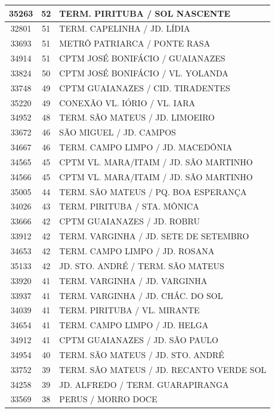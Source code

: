 \documentclass[
	12pt,				%
	oneside,			%
	a4paper,			%
	english,			%
	brazil				%
	]{abntex2ppgsi}
\begin{document}
{{{\begin{apendicesenv}
\begin{longtable}{c|c|p{7cm}}
 \hline 
35263 &	52 &	TERM. PIRITUBA / SOL NASCENTE \\ 
 \hline 
32801 &	51 &	TERM. CAPELINHA / JD. LÍDIA \\ 
 \hline 
33693 &	51 &	METRÔ PATRIARCA / PONTE RASA \\ 
 \hline 
34914 &	51 &	CPTM JOSÉ BONIFÁCIO / GUAIANAZES \\ 
 \hline 
33824 &	50 &	CPTM JOSÉ BONIFÁCIO / VL. YOLANDA \\ 
 \hline 
33748 &	49 &	CPTM GUAIANAZES / CID. TIRADENTES \\ 
 \hline 
35220 &	49 &	CONEXÃO VL. IÓRIO / VL. IARA \\ 
 \hline 
34952 &	48 &	TERM. SÃO MATEUS / JD. LIMOEIRO \\ 
 \hline 
33672 &	46 &	SÃO MIGUEL / JD. CAMPOS \\ 
 \hline 
34667 &	46 &	TERM. CAMPO LIMPO / JD. MACEDÔNIA \\ 
 \hline 
34565 &	45 &	CPTM VL. MARA/ITAIM / JD. SÃO MARTINHO \\ 
 \hline 
34566 &	45 &	CPTM VL. MARA/ITAIM / JD. SÃO MARTINHO \\ 
 \hline 
35005 &	44 &	TERM. SÃO MATEUS / PQ. BOA ESPERANÇA \\ 
 \hline 
34026 &	43 &	TERM. PIRITUBA / STA. MÔNICA \\ 
 \hline 
33666 &	42 &	CPTM GUAIANAZES / JD. ROBRU \\ 
 \hline 
33912 &	42 &	TERM. VARGINHA / JD. SETE DE SETEMBRO \\ 
 \hline 
34653 &	42 &	TERM. CAMPO LIMPO / JD. ROSANA \\ 
 \hline 
35133 &	42 &	JD. STO. ANDRÉ / TERM. SÃO MATEUS \\ 
 \hline 
33920 &	41 &	TERM. VARGINHA / JD. VARGINHA \\ 
 \hline 
33937 &	41 &	TERM. VARGINHA / JD. CHÁC. DO SOL \\ 
 \hline 
34039 &	41 &	TERM. PIRITUBA / VL. MIRANTE \\ 
 \hline 
34654 &	41 &	TERM. CAMPO LIMPO / JD. HELGA \\ 
 \hline 
34912 &	41 &	CPTM GUAIANAZES / JD. SÃO PAULO \\ 
 \hline 
34954 &	40 &	TERM. SÃO MATEUS / JD. STO. ANDRÉ \\ 
 \hline 
33752 &	39 &	TERM. SÃO MATEUS / JD. RECANTO VERDE SOL \\ 
 \hline 
34258 &	39 &	JD. ALFREDO / TERM. GUARAPIRANGA \\ 
 \hline 
33569 &	38 &	PERUS / MORRO DOCE \\ 

\end{longtable}
\end{apendicesenv}}}}
\end{document}
